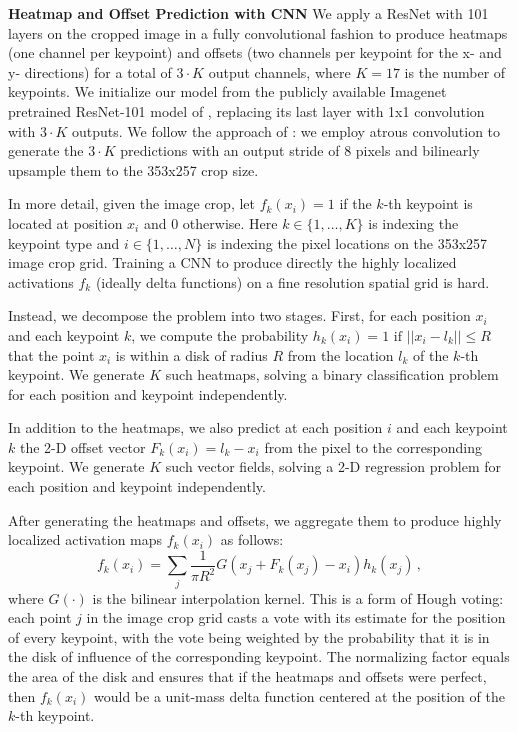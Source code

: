 \documentclass[10pt,twocolumn,letterpaper]{article}
\begin{document}
\textbf{Heatmap and Offset Prediction with CNN}
We apply a ResNet with 101 layers \cite{He2016ResNets} on the cropped image in a fully convolutional fashion to produce heatmaps (one channel per keypoint) and offsets (two channels per keypoint for the x- and y- directions) for a total of $3 \cdot K$ output channels, where $K=17$ is the number of keypoints. We initialize our model from the publicly available Imagenet pretrained ResNet-101 model of \cite{He2016ResNets}, replacing its last layer with 1x1 convolution with $3 \cdot K$ outputs. We follow the approach of \cite{chen2016deeplab}: we employ atrous convolution to generate the $3 \cdot K$ predictions with an output stride of 8 pixels and bilinearly upsample them to the 353x257 crop size.

In more detail, given the image crop, let $f_k(x_i) = 1$ if the $k$-th keypoint is located at position $x_i$ and 0 otherwise. Here $k \in \{1,\ldots,K\}$ is indexing the keypoint type and $i \in \{1,\dots,N\}$ is indexing the pixel locations on the 353x257 image crop grid. Training a CNN to produce directly the highly localized activations $f_k$ (ideally delta functions) on a fine resolution spatial grid is hard.

Instead, we decompose the problem into two stages. First, for each position $x_i$ and each keypoint $k$, we compute the probability $h_k(x_i) = 1 \mbox{ if } ||x_i - l_k|| \le R$ that the point $x_i$ is within a disk of radius $R$ from the location $l_k$ of the $k$-th keypoint. We generate $K$ such heatmaps, solving a binary classification problem for each position and keypoint independently.

In addition to the heatmaps, we also predict at each position $i$ and each keypoint $k$ the 2-D offset vector $F_k(x_i) = l_k - x_i$ from the pixel to the corresponding keypoint. We generate $K$ such vector fields, solving a 2-D regression problem for each position and keypoint independently.

After generating the heatmaps and offsets, we aggregate them to produce highly localized activation maps $f_k(x_i)$ as follows:
\begin{equation}
f_k(x_i) = \sum_{j} \frac{1}{\pi R^2} G(x_j + F_k(x_j) - x_i) h_k(x_j) \,,
\end{equation}
where $G(\cdot)$ is the bilinear interpolation kernel. This is a form of Hough voting: each point $j$ in the image crop grid casts a vote with its estimate for the position of every keypoint, with the vote being weighted by the probability that it is in the disk of influence of the corresponding keypoint. The normalizing factor equals the area of the disk and ensures that if the heatmaps and offsets were perfect, then $f_k(x_i)$ would be a unit-mass delta function centered at the position of the $k$-th keypoint.
\end{document}
